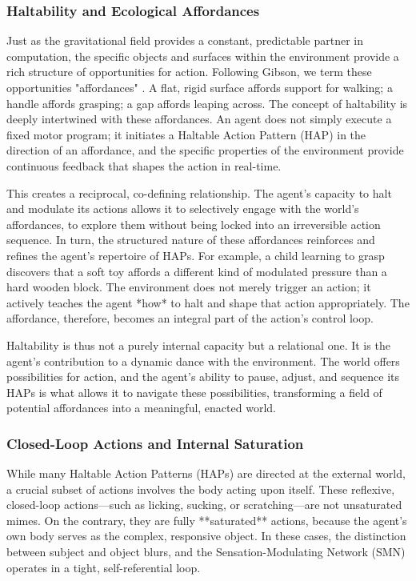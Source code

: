 \subsubsection{Haltability and Ecological Affordances}
\label{ssubsec:affordances}
Just as the gravitational field provides a constant, predictable partner in computation, the specific objects and surfaces within the environment provide a rich structure of opportunities for action. Following Gibson, we term these opportunities "affordances" \cite{gibson1977-vh}. A flat, rigid surface affords support for walking; a handle affords grasping; a gap affords leaping across. The concept of haltability is deeply intertwined with these affordances. An agent does not simply execute a fixed motor program; it initiates a Haltable Action Pattern (HAP) in the direction of an affordance, and the specific properties of the environment provide continuous feedback that shapes the action in real-time.

This creates a reciprocal, co-defining relationship. The agent’s capacity to halt and modulate its actions allows it to selectively engage with the world’s affordances, to explore them without being locked into an irreversible action sequence. In turn, the structured nature of these affordances reinforces and refines the agent’s repertoire of HAPs. For example, a child learning to grasp discovers that a soft toy affords a different kind of modulated pressure than a hard wooden block. The environment does not merely trigger an action; it actively teaches the agent *how* to halt and shape that action appropriately. The affordance, therefore, becomes an integral part of the action's control loop.

Haltability is thus not a purely internal capacity but a relational one. It is the agent's contribution to a dynamic dance with the environment. The world offers possibilities for action, and the agent's ability to pause, adjust, and sequence its HAPs is what allows it to navigate these possibilities, transforming a field of potential affordances into a meaningful, enacted world.

\subsubsection{Closed-Loop Actions and Internal Saturation}
\label{ssubsec:closed_loop}
While many Haltable Action Patterns (HAPs) are directed at the external world, a crucial subset of actions involves the body acting upon itself. These reflexive, closed-loop actions—such as licking, sucking, or scratching—are not unsaturated mimes. On the contrary, they are fully **saturated** actions, because the agent's own body serves as the complex, responsive object. In these cases, the distinction between subject and object blurs, and the Sensation-Modulating Network (SMN) operates in a tight, self-referential loop.

